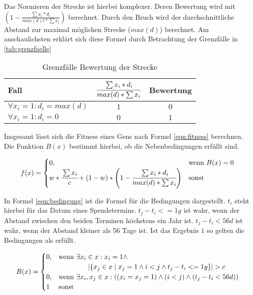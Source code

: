 Das Normieren der Strecke ist hierbei komplexer.
Deren Bewertung wird mit $(1 - \frac{\sum x_i * d_i}{max(d)t* \sum x_i})$ berechnet.
Durch den Bruch wird der durchschnittliche Abstand zur maximal möglichen Strecke ($max(d)$) berechnet.
Am anschaulichsten erklärt sich diese Formel durch Betrachtung der Grenzfälle in \autoref{tab:grenzfaelle}
\begin{table}[ht]%
    \begin{center}
        \begin{tabular}{l|c|c}
            Fall                            & $\cfrac{\sum x_i * d_i}{max(d) * \sum x_i}$  &  Bewertung \\
            \hline
            $\forall x_i = 1: d_i = max(d)$ & $1$                                           & $0$       \\
            $\forall x_i = 1: d_i = 0$      & $0$                                           & $1$       \\
        \end{tabular}
    \end{center}
    \caption{Grenzfälle Bewertung der Strecke}
    \label{tab:grenzfaelle}
  \end{table}

Insgesamt lässt sich die Fitness eines Gens nach Formel \ref{eqn:fitness} berechnen.
Die Funktion $B(x)$ bestimmt hierbei, ob die Nebenbedingungen erfüllt sind.

\begin{equation}
    \label{eqn:fitness}
    f(x)=
    \begin{cases}
        0,              & \text{wenn } B(x) = 0 \\
        w * \cfrac{\sum x_i}{c} + (1 - w) * \left(1 - \cfrac{\sum x_i * d_i}{max(d) * \sum x_i}\right) & \text{sonst}
    \end{cases}
\end{equation}

In Formel \ref{eqn:bedingung} ist die Formel für die Bedingungen dargestellt.
$t_i$ steht hierbei für das Datum eines Spendetermins.
$t_j - t_i <= 1y$ ist wahr, wenn der Abstand zwischen den beiden Terminen höchstens ein Jahr ist.
$t_j - t_i < 56d$ ist wahr, wenn der Abstand kleiner als 56 Tage ist.
Ist das Ergebnis $1$ so gelten die Bedingungen als erfüllt.



\begin{multline}
    \label{eqn:bedingung}
    B(x)=
    \begin{cases}
        0, & \text{wenn } \exists x_i \in x : x_i = 1  \wedge \\
           & \hspace{10ex} \lvert \{ x_j\in x \mid x_j = 1 \wedge i < j \wedge t_j - t_i <= 1y  \} \rvert > c   \\
        0, & \text{wenn } \exists x_i, x_j \in x : \left( (x_i = x_j = 1) \wedge (i < j) \wedge (t_j - t_i < 56d) \right)    \\
        1  & \text{sonst}
    \end{cases}
\end{multline}

